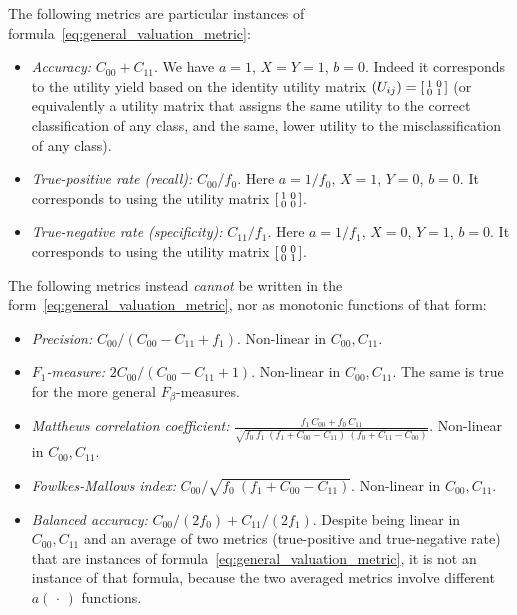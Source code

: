 \documentclass[\ifafour a4paper,12pt,\else a5paper,10pt,\fi%
onecolumn,oneside,article,%
british%
]{memoir}
\theoremstyle{remark}
\theoremstyle{innote}
\newcommand*{\dotv}{\mathord{\,\cdot\,}}%
\renewcommand*{\|}[1][]{\nonscript\:#1\vert\nonscript\:\mathopen{}}
\newcommand*{\itemyes}{{\fontencoding{U}\fontfamily{pzd}\selectfont\symbol{51}}}
\newcommand*{\itemno}{{\fontencoding{U}\fontfamily{pzd}\selectfont\symbol{55}}}
\newcommand*{\cx}{X}
\newcommand*{\cy}{Y}
\newcommand*{\sumatrix}[4]{\begin{bsmallmatrix*}[r]#1&#2\\#3&#4\end{bsmallmatrix*}}
\begin{document}
The following metrics are particular instances of formula~\eqref{eq:general_valuation_metric}:
\begin{itemize}
\item[\itemyes] \emph{Accuracy:} $C_{00}+C_{11}$. We have $a=1$, $\cx=\cy=1$, $b=0$. Indeed it corresponds to the utility yield based on the identity utility matrix $(U_{ij}) = \sumatrix{ 1}{0}{0}{1 }$ (or equivalently a utility matrix that assigns the same utility to the correct classification of any class, and the same, lower utility to the misclassification of any class).
  
\item[\itemyes] \emph{True-positive rate (recall):} $C_{00}/f_{0}$. Here $a=1/f_{0}$, $\cx=1$, $\cy=0$, $b=0$. It corresponds to using the utility matrix $\sumatrix{ 1}{0}{0}{0 }$. 

\item[\itemyes] \emph{True-negative rate (specificity):} $C_{11}/f_{1}$. Here $a=1/f_{1}$, $\cx=0$, $\cy=1$, $b=0$. It corresponds to using the utility matrix $\sumatrix{ 0}{0}{0}{1 }$. 
\end{itemize}

The following metrics instead \emph{cannot} be written in the form~\eqref{eq:general_valuation_metric}, nor as monotonic functions of that form:
\begin{itemize}
\item[\itemno] \emph{Precision:} $C_{00}/(C_{00}-C_{11}+f_{1})$. Non-linear in $C_{00}, C_{11}$.

\item[\itemno] \emph{$F_{1}$-measure:} $2 C_{00}/(C_{00} - C_{11} + 1)$. Non-linear in $C_{00}, C_{11}$. The same is true for the more general $F_{\beta}$-measures.

\item[\itemno] \emph{Matthews correlation coefficient:} $\frac{
    f_{1}\,C_{00} + f_{0}\,C_{11}}{\sqrt{
      f_{0}\ f_{1}\ (f_{1} + C_{00} - C_{11})\ (f_{0} + C_{11} - C_{00})
    }}$. Non-linear in $C_{00}, C_{11}$.

\item[\itemno] \emph{Fowlkes-Mallows index:} $C_{00}/\sqrt{
      f_{0}\ (f_{1} + C_{00} - C_{11})}$. Non-linear in $C_{00}, C_{11}$.

  \item[\itemno] \emph{Balanced accuracy:} $C_{00}/(2 f_{0}) + C_{11}/(2 f_{1})$. Despite being linear in $C_{00}, C_{11}$ and an average of two metrics (true-positive and true-negative rate) that are instances of formula~\eqref{eq:general_valuation_metric}, it is not an instance of that formula, because the two averaged metrics involve different $a(\dotv)$ functions.
\end{itemize}
\end{document}
